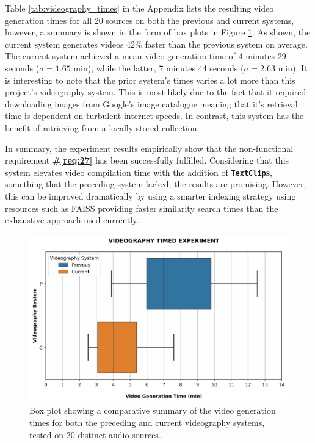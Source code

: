 \documentclass{l4proj}
\begin{document}
Table \ref{tab:videography_times} in the Appendix lists the resulting video generation times for all 20 sources on both the previous and current systems, however, a summary is shown in the form of box plots in Figure \ref{fig:videography_timed}. As shown, the current system generates videos
42\% faster than the previous system on average. The current system achieved a mean video generation time of 4 minutes 29 seconds ($\sigma = 1.65$ min), while the latter, 7 minutes 44 seconds ($\sigma = 2.63$ min). It is interesting to note that the prior system's times varies a lot more than this project's videography system. This is most likely due to the fact that it required downloading images from Google's image catalogue meaning that it's retrieval time is dependent on turbulent internet speeds. In contrast, this system has the benefit of retrieving from a locally stored collection.

In summary, the experiment results empirically show that the non-functional requirement \textbf{\#\ref{req:27}} has been successfully fulfilled. Considering that this system elevates video compilation time with the addition of \textbf{\lstinline|TextClip|s}, something that the preceding system lacked, the results are promising. However, this can be improved dramatically by using a smarter indexing strategy using resources such as FAISS providing faster similarity search times than the exhaustive approach used currently.

\begin{figure}
    \centering
    \includegraphics[width=1\textwidth]{figures/videography_timed_experiment.pdf}
    \caption{Box plot showing a comparative summary of the video generation times for both the preceding and current videography systems, tested on 20 distinct audio sources.}
    \label{fig:videography_timed}
\end{figure}
\end{document}
